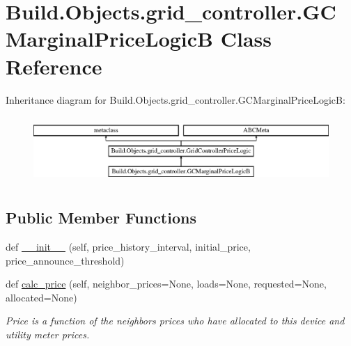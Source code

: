 \hypertarget{class_build_1_1_objects_1_1grid__controller_1_1_g_c_marginal_price_logic_b}{}\section{Build.\+Objects.\+grid\+\_\+controller.\+G\+C\+Marginal\+Price\+LogicB Class Reference}
\label{class_build_1_1_objects_1_1grid__controller_1_1_g_c_marginal_price_logic_b}
Inheritance diagram for Build.\+Objects.\+grid\+\_\+controller.\+G\+C\+Marginal\+Price\+LogicB\+:\begin{figure}[H]
\begin{center}
\leavevmode
\includegraphics[height=2.568807cm]{class_build_1_1_objects_1_1grid__controller_1_1_g_c_marginal_price_logic_b}
\end{center}
\end{figure}
\subsection*{Public Member Functions}
\begin{DoxyCompactItemize}
\item 
def \hyperlink{class_build_1_1_objects_1_1grid__controller_1_1_g_c_marginal_price_logic_b_a74e1d712f6e032bd45240d28d892c368}{\+\_\+\+\_\+init\+\_\+\+\_\+} (self, price\+\_\+history\+\_\+interval, initial\+\_\+price, price\+\_\+announce\+\_\+threshold)
\item 
def \hyperlink{class_build_1_1_objects_1_1grid__controller_1_1_g_c_marginal_price_logic_b_a3f0d251ac1acb87e09895cffbbe364f2}{calc\+\_\+price} (self, neighbor\+\_\+prices=None, loads=None, requested=None, allocated=None)
\begin{DoxyCompactList}\small\item\em Price is a function of the neighbors prices who have allocated to this device and utility meter prices. \end{DoxyCompactList}\end{DoxyCompactItemize}


